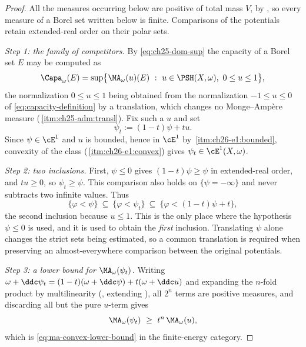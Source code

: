 \begin{proof}
All the measures occurring below are positive of total mass $V$, by
, so every measure of a Borel set written
below is finite.  Comparisons of the potentials retain extended-real
order on their polar sets.

\emph{Step 1: the family of competitors.}  By
\eqref{eq:ch25-dom-sup} the capacity of a Borel set $E$ may be computed
as
\begin{equation}
\label{eq:ch29-capacity-as-sup}
 \Capa_\omega(E)
 =\sup\bigl\{\MA_\omega(u)(E)\ :\ u\in\PSH(X,\omega),\ 0\leq u\leq1\bigr\},
\end{equation}
the normalization $0\leq u\leq1$ being obtained from the normalization
$-1\leq u\leq0$ of \eqref{eq:capacity-definition} by a translation, which
changes no Monge--Amp\`ere measure
(\,\cref{itm:ch25-adm:transl}).  Fix such
a $u$ and set
\[
 \psi_t:=(1-t)\psi+tu .
\]
Since $\psi\in\cE^1$ and $u$ is bounded, hence in $\cE^1$ by
\,\cref{itm:ch26-e1:bounded}, convexity of the
class (\,\cref{itm:ch26-e1:convex}) gives
$\psi_t\in\cE^1(X,\omega)$.

\emph{Step 2: two inclusions.}  First, $\psi\leq0$ gives $(1-t)\psi\geq\psi$ in extended-real
order, and $tu\geq0$, so $\psi_t\geq\psi$.  This comparison also holds
on $\{\psi=-\infty\}$ and never subtracts two infinite values.  Thus
\begin{equation}
\label{eq:ch29-two-inclusions}
 \{\varphi<\psi\}\ \subseteq\ \{\varphi<\psi_t\}
 \ \subseteq\ \{\varphi<(1-t)\psi+t\},
\end{equation}
the second inclusion because $u\leq1$.  This is the only place where the
hypothesis $\psi\leq0$ is used, and it is used to obtain the \emph{first}
inclusion.  Translating $\psi$ alone changes the strict sets being
estimated, so a common translation is required when preserving an
almost-everywhere comparison between the original potentials.

\emph{Step 3: a lower bound for $\MA_\omega(\psi_t)$.}  Writing
$\omega+\ddc\psi_t=(1-t)(\omega+\ddc\psi)+t(\omega+\ddc u)$ and expanding
the $n$-fold product by multilinearity
(, extending
), all $2^n$ terms are positive
measures, and discarding all but the pure $u$-term gives
\begin{equation}
\label{eq:ch29-convexity-lower-bound}
 \MA_\omega(\psi_t)\ \geq\ t^n\,\MA_\omega(u),
\end{equation}
which is \eqref{eq:ma-convex-lower-bound} in the finite-energy category.


\end{proof}
